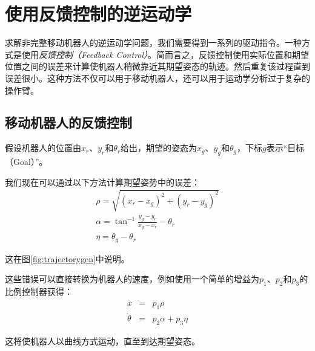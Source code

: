 \section{使用反馈控制的逆运动学} 
\label{sec:advinvkinematics}

求解非完整移动机器人的逆运动学问题，我们需要得到一系列的驱动指令。一种方式是使用\emph{反馈控制（Feedback Control）}。简而言之，反馈控制使用实际位置和期望位置之间的误差来计算使机器人稍微靠近其期望姿态的轨迹。然后重复该过程直到误差很小。这种方法不仅可以用于移动机器人，还可以用于运动学分析过于复杂的操作臂。

\subsection {移动机器人的反馈控制} 
\label{sec:fbmobile}

假设机器人的位置由$x_r$、$y_r $和$ \theta_r $给出，期望的姿态为$ x_g$、$y_g $和$ \theta_g $，下标$ g $表示“目标（Goal）”。

我们现在可以通过以下方法计算期望姿势中的误差：
\begin{eqnarray}
\rho=\sqrt{(x_r-x_g)^2+(y_r-y_g)^2}\\
\nonumber
\alpha=\tan^{-1}{\frac{y_g-y_r}{x_g-x_r}}-\theta_r\\
\nonumber
\eta=\theta_g-\theta_r
\end{eqnarray}

这在图\ref{fig:trajectorygen}中说明。


这些错误可以直接转换为机器人的速度，例如使用一个简单的增益为$p_1$、$p_2$和$p_3$的比例控制器获得：
\begin{eqnarray}
\dot{x} &=& p_1 \rho\\
\dot{\theta} &=& p_2 \alpha + p_3 \eta
\end{eqnarray}

这将使机器人以曲线方式运动，直至到达期望姿态。

